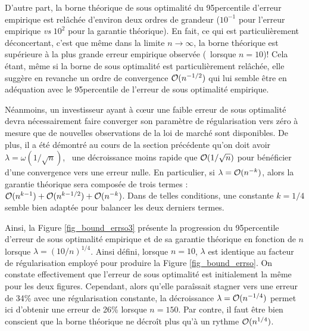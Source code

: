 D'autre part, la borne théorique de sous optimalité du 95\ieme percentile d'erreur
empirique est relâchée d'environ deux ordres de grandeur ($10^{-1}$ pour l'erreur
empirique \textit{vs} $10^{2}$ pour la garantie théorique). En fait, ce qui est
particulièrement déconcertant, c'est que même dans la limite $n\to\infty$, la borne théorique est
supérieure à la plus grande erreur empirique observée (\ie\ lorsque $n=10$)!  Cela étant,
même si la borne de sous optimalité est particulièrement relâchée, elle suggère en
revanche un ordre de convergence $\mathcal O(n^{-1/2})$ qui lui semble être en adéquation avec
le 95\ieme percentile de l'erreur de sous optimalité empirique.

Néanmoins, un investisseur ayant à cœur une faible erreur de sous optimalité devra
nécessairement faire converger son paramètre de régularisation vers zéro à mesure que de
nouvelles observations de la loi de marché sont disponibles. De plus, il a été démontré au
cours de la section précédente qu'on doit avoir $\lambda = \omega(1/\sqrt{n})$, \ie\ une décroissance
moins rapide que $\mathcal O(1/\sqrt{n})$ pour bénéficier d'une convergence vers une erreur
nulle. En particulier, si $\lambda = \mathcal O(n^{-k})$, alors la garantie théorique sera composée
de trois termes : $\mathcal O(n^{k-1}) + \mathcal O(n^{k-1/2}) + \mathcal O(n^{-k})$. Dans de telles
conditions, une constante $k=1/4$ semble bien adaptée pour balancer les deux derniers
termes.

Ainsi, la Figure \ref{fig_bound_errso3} présente la progression du 95\ieme percentile
d'erreur de sous optimalité empirique et de sa garantie théorique en fonction de $n$
lorsque $\lambda=(10/n)^{1/4}$. Ainsi défini, lorsque $n=10$, $\lambda$ est identique au facteur de
régularisation employé pour produire la Figure \ref{fig_bound_errso}. On constate
effectivement que l'erreur de sous optimalité est initialement la même pour les deux
figures. Cependant, alors qu'elle paraîssait stagner vers une erreur de 34\% avec une
régularisation constante, la décroissance $\lambda = \mathcal O(n^{-1/4})$ permet ici d'obtenir une
erreur de 26\% lorsque $n=150$. Par contre, il faut être bien conscient que la borne
théorique ne décroît plus qu'à un rythme $\mathcal O(n^{1/4})$.

\newpage


